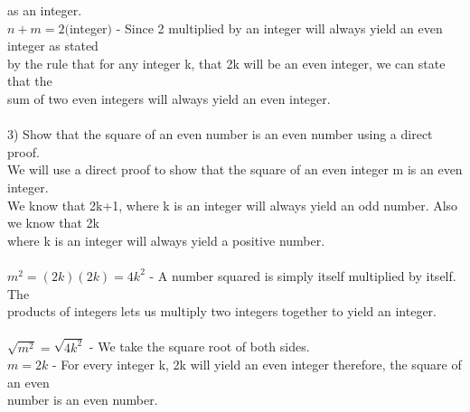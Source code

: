 \documentclass{article}
\begin{document}
\begin{flushleft}
as an integer.\\
\setlength\parindent{24pt}$n + m = 2($integer$)$ - Since 2 multiplied by an integer will always yield an even integer as stated \\
by the rule that for any integer k, that 2k will be an even integer, we can state that the \\
sum of two even integers will always yield an even integer.\\
~\\
\setlength\parindent{0pt}3) Show that the square of an even number is an even number using a direct proof.\\
\setlength\parindent{24pt} We will use a direct proof to show that the square of an even integer m is an even integer.\\
\setlength\parindent{24pt} We know that 2k+1, where k is an integer will always yield an odd number.  Also we know that 2k \\
where k is an integer will always yield a positive number.\\
~\\

\setlength\parindent{24pt}$m^2 = (2k)(2k) = 4k^2$ - A number squared is simply itself multiplied by itself.  The \\
products of integers lets us multiply two integers together to yield an integer.\\
~\\\setlength\parindent{24pt}$\sqrt{m^2} = \sqrt{4k^2}$ - We take the square root of both sides.\\
\setlength\parindent{24pt}$m = 2k$ - For every integer k, 2k will yield an even integer therefore, the square of an even\\
 number is an even number.\\


\end{flushleft}
\end{document}
